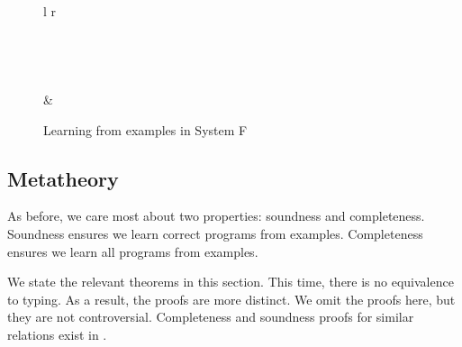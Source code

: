 \documentclass[sigplan,10pt]{acmart}
\theoremstyle{mytheoremstyle}
\begin{document}
\begin{figure*}[t]
\begin{tabular}{l r}
{        \DisplayProof
    } \\\\
     \\\\
     \\
    & \\
\specialrule{.1em}{1em}{0em}
\end{tabular}
\caption{Learning from examples in System F}
    \label{fig:learning-examples}
\end{figure*}

\subsection{Metatheory}
As before, we care most about two properties: soundness and completeness. Soundness ensures we learn correct programs from examples. Completeness ensures we learn all programs from examples.

We state the relevant theorems in this section. This time, there is no equivalence to typing. As a result, the proofs are more distinct. We omit the proofs here, but they are not controversial. Completeness and soundness proofs for similar relations exist in \cite{osera2015program}.
\end{document}
